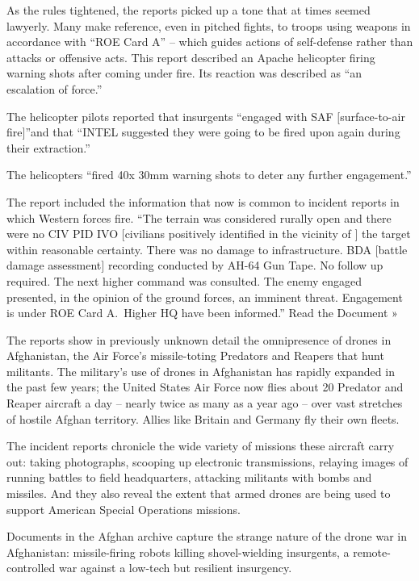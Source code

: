 ﻿\documentclass[12pt]{article}
\begin{document}
As the rules tightened, the reports picked up a tone that at times seemed lawyerly. Many make
reference, even in pitched fights, to troops using weapons in accordance with ``ROE Card A'' --
which guides actions of self-defense rather than attacks or offensive acts. This report described an
Apache helicopter firing warning shots after coming under fire. Its reaction was described as ``an
escalation of force.''

The helicopter pilots reported that insurgents ``engaged with SAF $[$surface-to-air fire$]$''and
that ``INTEL suggested they were going to be fired upon again during their extraction.''

The helicopters ``fired 40x 30mm warning shots to deter any further engagement.''

The report included the information that now is common to incident reports in which Western forces
fire. ``The terrain was considered rurally open and there were no CIV PID IVO $[$civilians
positively identified in the vicinity of $]$ the target within reasonable certainty. There was no
damage to infrastructure. BDA $[$battle damage assessment$]$ recording conducted by AH-64 Gun Tape.
No follow up required. The next higher command was consulted. The enemy engaged presented, in the
opinion of the ground forces, an imminent threat. Engagement is under ROE Card A.~Higher HQ have
been informed.'' Read the Document »

The reports show in previously unknown detail the omnipresence of drones in Afghanistan, the Air
Force's missile-toting Predators and Reapers that hunt militants. The military's use of drones in
Afghanistan has rapidly expanded in the past few years; the United States Air Force now flies about
20 Predator and Reaper aircraft a day -- nearly twice as many as a year ago -- over vast stretches
of hostile Afghan territory. Allies like Britain and Germany fly their own fleets.

The incident reports chronicle the wide variety of missions these aircraft carry out: taking
photographs, scooping up electronic transmissions, relaying images of running battles to field
headquarters, attacking militants with bombs and missiles. And they also reveal the extent that
armed drones are being used to support American Special Operations missions.

Documents in the Afghan archive capture the strange nature of the drone war in Afghanistan:
missile-firing robots killing shovel-wielding insurgents, a remote-controlled war against a low-tech
but resilient insurgency.
\end{document}
